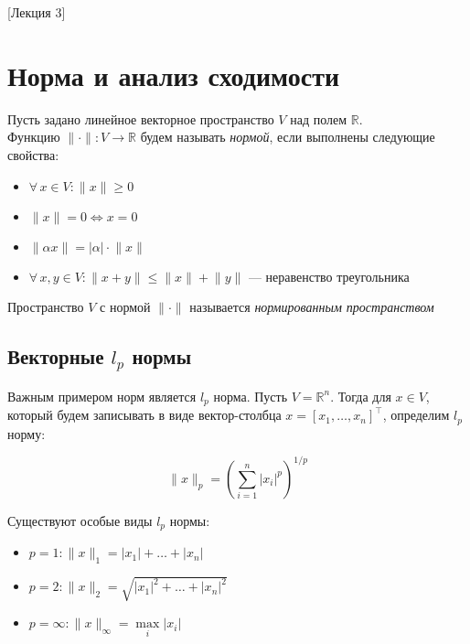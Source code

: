 [Лекция 3]

\newpage

\section{Норма и анализ сходимости}

\begin{definition}
    Пусть задано линейное векторное пространство $V$ над полем $\mathbb{R}$. \\ Функцию $\lVert \cdot \rVert: V \longrightarrow \mathbb{R}$ будем называть \textit{нормой}, если выполнены следующие свойства:

    \begin{itemize}
        \item $\forall \, x \in V: \lVert x \rVert \geqslant 0$
        \item $\lVert x \rVert = 0 \iff x = 0$
        \item $\lVert \alpha x \rVert = |\alpha| \cdot \lVert x \rVert$
        \item $\forall \, x, y \in V: \lVert x + y \rVert \leqslant \lVert x \rVert + \lVert y \rVert$ --- неравенство треугольника
    \end{itemize}

    Пространство $V$ с нормой $\lVert \cdot \rVert$ называется \textit{нормированным пространством}
\end{definition}

\subsection{Векторные $l_p$ нормы}

Важным примером норм является $l_p$ норма. Пусть $V = \mathbb{R}^n$. Тогда для $x \in V$, который будем записывать в виде вектор-столбца $x = [x_1, \ldots, x_n]^{\top}$, определим $l_p$ норму:

\[
\lVert x \rVert_p = \left(\sum\limits_{i = 1}^n |x_i|^p\right)^{1/p}
\]

Существуют особые виды $l_p$ нормы:

\begin{itemize}
    \item $p = 1: \lVert x \rVert_1 = |x_1| + \ldots + |x_n|$
    \item $p = 2: \lVert x \rVert_2 = \sqrt{|x_1|^2 + \ldots + |x_n|^2}$
    \item $p = \infty: \lVert x \rVert_{\infty} = \max\limits_{i} |x_i|$
\end{itemize}

